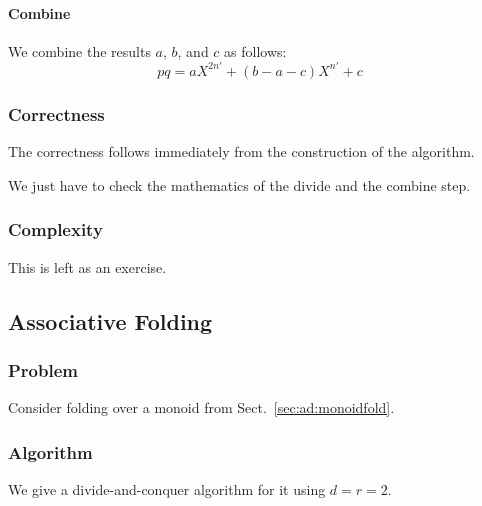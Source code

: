 \paragraph{Combine}
We combine the results $a$, $b$, and $c$ as follows:
 \[pq=a X^{2n'} + (b-a-c)X^{n'} + c\]

\subsubsection{Correctness}

The correctness follows immediately from the construction of the algorithm.

We just have to check the mathematics of the divide and the combine step.

\subsubsection{Complexity}

This is left as an exercise.


\subsection{Associative Folding}\label{sec:ad:monoidfold:divide}

\subsubsection{Problem}

Consider folding over a monoid from Sect.~\ref{sec:ad:monoidfold}.

\subsubsection{Algorithm}

We give a divide-and-conquer algorithm for it using $d=r=2$.

\begin{acode}
\end{acode}

